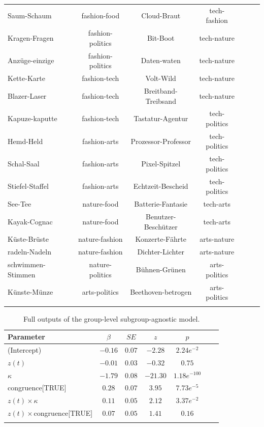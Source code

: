 \documentclass[pdflatex,sn-mathphys]{sn-jnl}
\begin{document}
\begin{table}[h]
\begin{center}
\begin{minipage}{\textwidth}
\begin{tabular*}{\textwidth}{@{\extracolsep{\fill}}lcccccc@{\extracolsep{\fill}}}
Saum-Schaum & fashion-food & Cloud-Braut & tech-fashion \\
Kragen-Fragen & fashion-politics & Bit-Boot & tech-nature \\
Anzüge-einzige & fashion-politics & Daten-waten& tech-nature \\
Kette-Karte & fashion-tech & Volt-Wild & tech-nature \\
Blazer-Laser & fashion-tech & Breitband-Treibsand & tech-nature \\
Kapuze-kaputte & fashion-tech & Tastatur-Agentur & tech-politics \\
Hemd-Held & fashion-arts & Prozessor-Professor & tech-politics \\
Schal-Saal & fashion-arts & Pixel-Spitzel & tech-politics \\
Stiefel-Staffel & fashion-arts & Echtzeit-Bescheid & tech-politics \\
See-Tee & nature-food & Batterie-Fantasie & tech-arts \\
Kayak-Cognac & nature-food & Benutzer-Beschützer & tech-arts \\
Küste-Brüste & nature-fashion & Konzerte-Fährte & arts-nature \\
radeln-Nadeln & nature-fashion & Dichter-Lichter & arts-nature \\
schwimmen-Stimmen & nature-politics & Bühnen-Grünen & arts-politics \\
Künste-Münze & arts-politics & Beethoven-betrogen & arts-politics \\
\botrule
\end{tabular*}
\end{minipage}
\end{center}
\end{table}

\begin{table}[t]
\begin{center}
\begin{minipage}{\textwidth}
\caption{Full outputs of the group-level subgroup-agnostic model.}\label{tab2}
\begin{tabular*}{\textwidth}{@{\extracolsep{\fill}}lcccccc@{\extracolsep{\fill}}}
\toprule%
Parameter & $\beta$ & $SE$ & $z$ & $p$ \\
\midrule
(Intercept) & $-0.16$ & $0.07$ & $-2.28$ & $2.24e^{-2}$ \\
$z(t)$ & $-0.01$ & $0.03$ & $-0.32$ & $0.75$ \\
$\kappa$ & $-1.79$ & $0.08$ & $-21.30$ & $1.18e^{-100}$ \\
congruence[TRUE] & $0.28$ & $0.07$ & $3.95$ & $7.73e^{-5}$ \\
$z(t)\times\kappa$ & $0.11$ & $0.05$ & $2.12$ & $3.37e^{-2}$ \\
$z(t)\times$congruence[TRUE] & $0.07$ & $0.05$ & $1.41$ & $0.16$ \\
\botrule
\end{tabular*}
\end{minipage}
\end{center}
\end{table}
\end{document}
